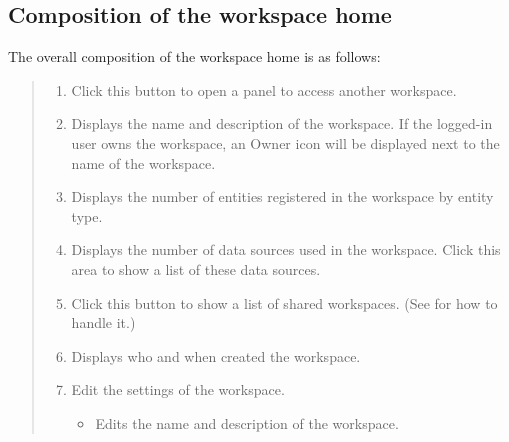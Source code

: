 \documentclass[letterpaper,10pt,english]{sphinxmanual}
\begin{document}
\subsection{Composition of the workspace home}
\label{\detokenize{discovery/part03/workspace_management:id2}}
The overall composition of the workspace home is as follows:
\begin{quote}

\begin{figure}[H]
\centering

\noindent{}
\end{figure}
\begin{enumerate}
\def\theenumi{\arabic{enumi}}
\def\labelenumi{\theenumi .}
\makeatletter\def\p@enumii{\p@enumi \theenumi .}\makeatother
\item {} 
 Click this button to open a panel to access another workspace.

\item {} 
 Displays the name and description of the workspace. If the logged-in user owns the workspace, an Owner icon will be displayed next to the name of the workspace.

\item {} 
 Displays the number of entities registered in the workspace by entity type.

\item {} 
 Displays the number of data sources used in the workspace. Click this area to show a list of these data sources.

\item {} 
 Click this button to show a list of shared workspaces. (See {\hyperref[\detokenize{discovery/part03/shared_workspace:shared-workspace-list}]{}} for how to handle it.)

\item {} 
 Displays who and when created the workspace.

\item {} 
 Edit the settings of the workspace.
\begin{itemize}
\item {} 
 Edits the name and description of the workspace.


\end{itemize}
\end{enumerate}
\end{quote}
\end{document}
